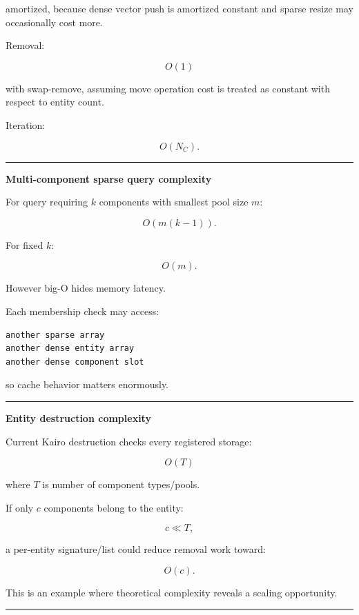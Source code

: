 amortized, because dense vector push is amortized constant and sparse resize may occasionally cost more.

Removal:

\[
O(1)
\]

with swap-remove, assuming move operation cost is treated as constant with respect to entity count.

Iteration:

\[
O(N_C).
\]

\begin{center}\rule{0.5\linewidth}{0.5pt}\end{center}

\textbf{Multi-component sparse query complexity}

For query requiring \(k\) components with smallest pool size \(m\):

\[
\boxed{
O(m(k-1)).
}
\]

For fixed \(k\):

\[
O(m).
\]

However big-O hides memory latency.

Each membership check may access:

\begin{verbatim}
another sparse array
another dense entity array
another dense component slot
\end{verbatim}

so cache behavior matters enormously.

\begin{center}\rule{0.5\linewidth}{0.5pt}\end{center}

\textbf{Entity destruction complexity}

Current Kairo destruction checks every registered storage:

\[
O(T)
\]

where \(T\) is number of component types/pools.

If only \(c\) components belong to the entity:

\[
c\ll T,
\]

a per-entity signature/list could reduce removal work toward:

\[
O(c).
\]

This is an example where theoretical complexity reveals a scaling opportunity.

\begin{center}\rule{0.5\linewidth}{0.5pt}\end{center}

